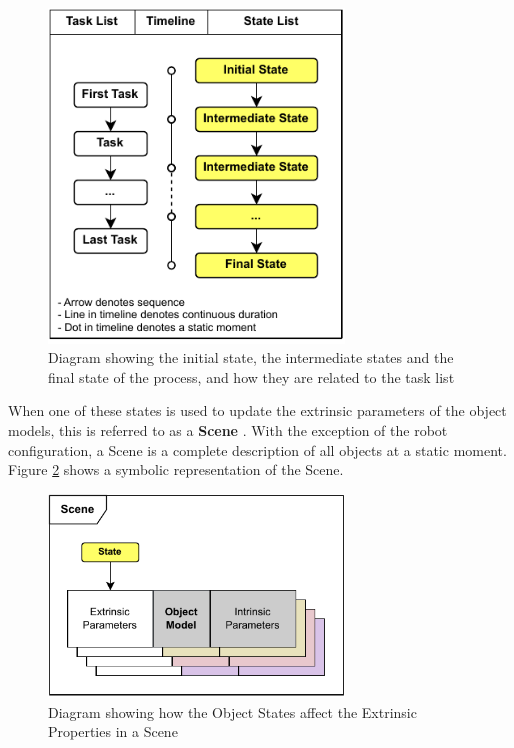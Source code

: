 \begin{figure}[!hp]
    \centering
    \includegraphics[width=0.70\textwidth]{images/6a/tasklist.pdf}
    \caption{Diagram showing the initial state, the intermediate states and the final state of the process, and how they are related to the task list}
    \label{fig:intermediate-states}
\end{figure}


When one of these states is used to update the extrinsic parameters of the object models, this is referred to as a \textbf{Scene} \parencite{moveit!PlanningSceneROS2023}. With the exception of the robot configuration, a Scene is a complete description of all objects at a static moment. Figure \ref{fig:intrinsic-extrinsic-in-scene} shows a symbolic representation of the Scene.

\begin{figure}[!hp]
    \centering
    \includegraphics[width=0.70\textwidth]{images/6a/intrinsic-extrinsic.pdf}
    \caption{Diagram showing how the Object States affect the Extrinsic Properties in a Scene}
    \label{fig:intrinsic-extrinsic-in-scene}
\end{figure}

